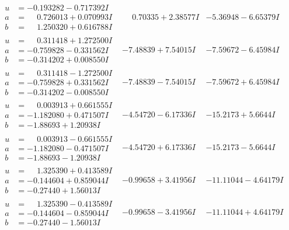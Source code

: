 \documentclass[1p]{elsarticle_modified}
\theoremstyle{definition}
\begin{document}
$$\begin{array}{c|c|c}
\begin{aligned}
u &= -0.193282 - 0.717392 I \\
a &= \phantom{-}0.726013 + 0.070993 I \\
b &= \phantom{-}1.250320 + 0.616788 I\end{aligned}
 & \phantom{-}0.70335 + 2.38577 I & -5.36948 - 6.65379 I \\ \hline\begin{aligned}
u &= \phantom{-}0.311418 + 1.272500 I \\
a &= -0.759828 - 0.331562 I \\
b &= -0.314202 + 0.008550 I\end{aligned}
 & -7.48839 + 7.54015 I & -7.59672 - 6.45984 I \\ \hline\begin{aligned}
u &= \phantom{-}0.311418 - 1.272500 I \\
a &= -0.759828 + 0.331562 I \\
b &= -0.314202 - 0.008550 I\end{aligned}
 & -7.48839 - 7.54015 I & -7.59672 + 6.45984 I \\ \hline\begin{aligned}
u &= \phantom{-}0.003913 + 0.661555 I \\
a &= -1.182080 + 0.471507 I \\
b &= -1.88693 + 1.20938 I\end{aligned}
 & -4.54720 - 6.17336 I & -15.2173 + 5.6644 I \\ \hline\begin{aligned}
u &= \phantom{-}0.003913 - 0.661555 I \\
a &= -1.182080 - 0.471507 I \\
b &= -1.88693 - 1.20938 I\end{aligned}
 & -4.54720 + 6.17336 I & -15.2173 - 5.6644 I \\ \hline\begin{aligned}
u &= \phantom{-}1.325390 + 0.413589 I \\
a &= -0.144604 + 0.859044 I \\
b &= -0.27440 + 1.56013 I\end{aligned}
 & -0.99658 + 3.41956 I & -11.11044 - 4.64179 I \\ \hline\begin{aligned}
u &= \phantom{-}1.325390 - 0.413589 I \\
a &= -0.144604 - 0.859044 I \\
b &= -0.27440 - 1.56013 I\end{aligned}
 & -0.99658 - 3.41956 I & -11.11044 + 4.64179 I \\ \hline\begin{aligned}

\end{aligned}
\end{array}$$
\end{document}
